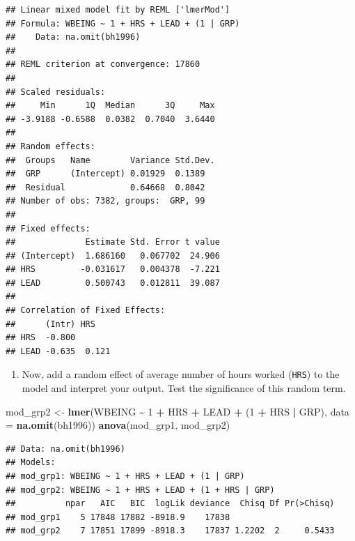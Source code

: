 \documentclass[
]{book}
\newenvironment{Shaded}{\begin{snugshade}}{\end{snugshade}}
\newcommand{\DataTypeTok}[1]{\textcolor[rgb]{0.13,0.29,0.53}{#1}}
\newcommand{\DecValTok}[1]{\textcolor[rgb]{0.00,0.00,0.81}{#1}}
\newcommand{\KeywordTok}[1]{\textcolor[rgb]{0.13,0.29,0.53}{\textbf{#1}}}
\newcommand{\NormalTok}[1]{#1}
\newcommand{\OperatorTok}[1]{\textcolor[rgb]{0.81,0.36,0.00}{\textbf{#1}}}
\newcommand{\StringTok}[1]{\textcolor[rgb]{0.31,0.60,0.02}{#1}}
\providecommand{\tightlist}{%
  \setlength{\itemsep}{0pt}\setlength{\parskip}{0pt}}
\begin{document}
\begin{alert}
\begin{verbatim}
## Linear mixed model fit by REML ['lmerMod']
## Formula: WBEING ~ 1 + HRS + LEAD + (1 | GRP)
##    Data: na.omit(bh1996)
## 
## REML criterion at convergence: 17860
## 
## Scaled residuals: 
##     Min      1Q  Median      3Q     Max 
## -3.9188 -0.6588  0.0382  0.7040  3.6440 
## 
## Random effects:
##  Groups   Name        Variance Std.Dev.
##  GRP      (Intercept) 0.01929  0.1389  
##  Residual             0.64668  0.8042  
## Number of obs: 7382, groups:  GRP, 99
## 
## Fixed effects:
##              Estimate Std. Error t value
## (Intercept)  1.686160   0.067702  24.906
## HRS         -0.031617   0.004378  -7.221
## LEAD         0.500743   0.012811  39.087
## 
## Correlation of Fixed Effects:
##      (Intr) HRS   
## HRS  -0.800       
## LEAD -0.635  0.121
\end{verbatim}

\begin{enumerate}
\def\labelenumi{\arabic{enumi}.}
\setcounter{enumi}{3}
\tightlist
\item
  Now, add a random effect of average number of hours worked (\texttt{HRS}) to the model and interpret your output. Test the significance of this random term.
\end{enumerate}

\begin{Shaded}
\begin{Highlighting}[]
\NormalTok{  mod\_grp2 \textless{}{-}}\StringTok{ }\KeywordTok{lmer}\NormalTok{(WBEING }\OperatorTok{\textasciitilde{}}\StringTok{ }\DecValTok{1} \OperatorTok{+}\StringTok{ }\NormalTok{HRS }\OperatorTok{+}\StringTok{ }\NormalTok{LEAD }\OperatorTok{+}\StringTok{ }\NormalTok{(}\DecValTok{1} \OperatorTok{+}\StringTok{ }\NormalTok{HRS }\OperatorTok{|}\StringTok{ }\NormalTok{GRP), }\DataTypeTok{data =} \KeywordTok{na.omit}\NormalTok{(bh1996))}
  \KeywordTok{anova}\NormalTok{(mod\_grp1, mod\_grp2)}
\end{Highlighting}
\end{Shaded}

\begin{verbatim}
## Data: na.omit(bh1996)
## Models:
## mod_grp1: WBEING ~ 1 + HRS + LEAD + (1 | GRP)
## mod_grp2: WBEING ~ 1 + HRS + LEAD + (1 + HRS | GRP)
##          npar   AIC   BIC  logLik deviance  Chisq Df Pr(>Chisq)
## mod_grp1    5 17848 17882 -8918.9    17838                     
## mod_grp2    7 17851 17899 -8918.3    17837 1.2202  2     0.5433
\end{verbatim}

\end{alert}
\end{document}
